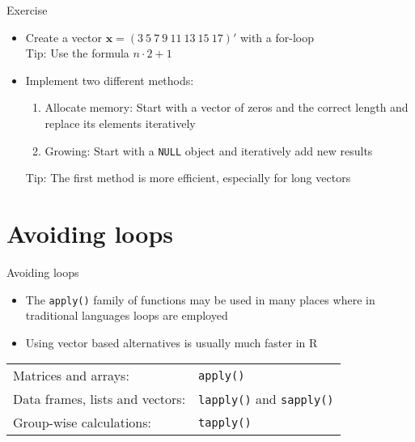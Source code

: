 \documentclass[aspectratio=169]{beamer}
\begin{document}
\begin{frame}{}
  \begin{block}{Exercise}
    \begin{itemize}
    \item Create a vector $\mathbf{x} = (3~5~7~9~11~13~15~17)'$ with a
    for-loop\\ Tip: Use the formula $n\cdot2 + 1$
    \item Implement two different methods:
    \begin{enumerate}
    \item Allocate memory: Start with a vector of zeros and the correct
      length and replace its elements iteratively
    
    \item Growing: Start with a \texttt{NULL} object and iteratively add new
      results
    \end{enumerate}
    Tip: The first method is more efficient, especially for long vectors
    \end{itemize}
  \end{block}
\end{frame}


\section[apply()]{Avoiding loops}

\begin{frame}{Avoiding loops}
  \begin{itemize}
    \item The \texttt{apply()} family of functions may be used in many
      places where in traditional languages loops are employed
    \item Using vector based alternatives is usually much faster in R
  \end{itemize}
  \vspace{.2cm}
  \begin{center}
    \begin{tabular}{ll}
      \hline
      Matrices and arrays: & \texttt{apply()} \\
      Data frames, lists and vectors: & \texttt{lapply()} and
      \texttt{sapply()} \\
      Group-wise calculations: & \texttt{tapply()} \\
      \hline
    \end{tabular}
  \end{center}
\nocite{Ligges2008}
\end{frame}
\end{document}
